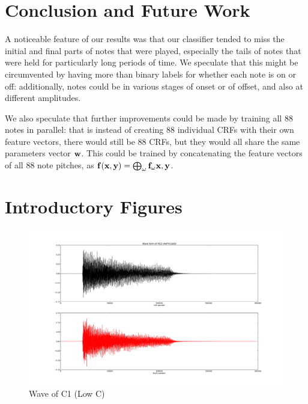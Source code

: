 \documentclass{article}
\begin{document}
\section{Conclusion and Future Work}


A noticeable feature of our results was that our classifier tended to miss the
initial and final parts of notes that were played, especially the tails of
notes that were held for particularly long periods of time.
We speculate that this might be circumvented by having more than binary labels
for whether each note is on or off: additionally, notes could be in various
stages of onset or of offset, and also at different amplitudes.

We also speculate that further improvements could be made by training all 88
notes in parallel: that is instead of creating 88 individual CRFs with their
own feature vectors, there would still be 88 CRFs, but they would all share
the same parameters vector $\mathbf{w}$. This could be trained by concatenating the
feature vectors of all 88 note pitches, as $\mathbf{f}(\mathbf{x},\mathbf{y}) =
\bigoplus_{\omega}\mathbf{f}_{\omega}{\mathbf{x},\mathbf{y}}$. 





\section{Introductory Figures}
\begin{figure}
\includegraphics[scale=.13]{wave_m23.png}
\caption{Wave of C1 (Low C)}
\label{fig:wave}
\end{figure}
\end{document}
